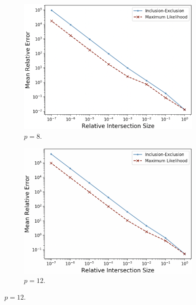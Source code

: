 \documentclass[10]{article}
\begin{document}
\begin{figure}
	\begin{center}
		\begin{subfigure}{0.45\linewidth}
			\centerline{\includegraphics[width=1.0\columnwidth]{relative_intersection_size_vs_relative_error_equal}}
			\caption{$p = 8$. \label{fig:relative_intersection_size_equal_8}}
		\end{subfigure}%
		\hspace{1em}%
		\begin{subfigure}{0.45\linewidth}
			\centerline{\includegraphics[width=1.0\columnwidth]{relative_intersection_size_vs_relative_error_equal_8}}
			\caption{$p = 12$. \label{fig:relative_intersection_size_equal_12}}
		\end{subfigure}%

\end{center}
\end{figure}
\end{document}
